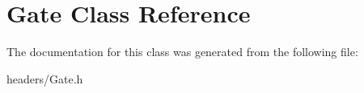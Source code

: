 \hypertarget{class_gate}{}\section{Gate Class Reference}
\label{class_gate}


The documentation for this class was generated from the following file\+:\begin{DoxyCompactItemize}
\item 
headers/Gate.\+h\end{DoxyCompactItemize}
